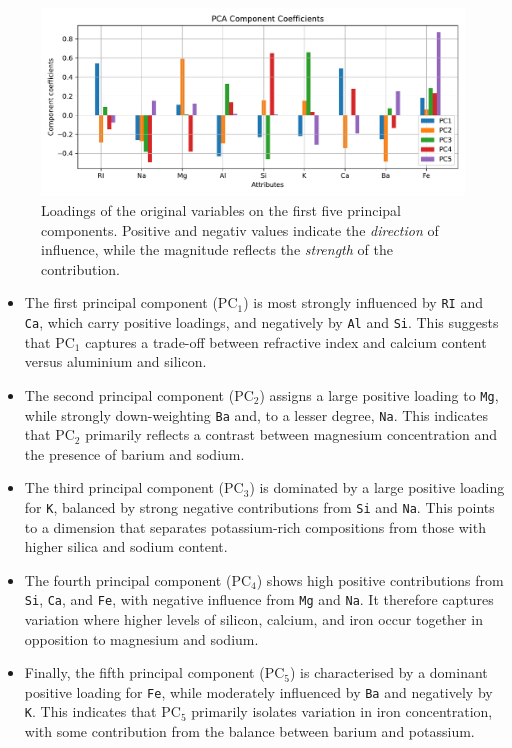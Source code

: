 \documentclass[dtu]{dtuarticle}
\begin{document}
	\begin{figure}
		\centering
		\includegraphics[width=.99\textwidth]{figures/pca_component_coefficients}
		\caption{Loadings of the original variables on the first five principal components. Positive and negativ values indicate the \textit{direction} of influence, while the magnitude reflects the \textit{strength} of the contribution.}
		\label{fig:pc-components}
	\end{figure}

	\begin{itemize}
		\item The first principal component ($\text{PC}_1$) is most strongly influenced by \texttt{RI} and \texttt{Ca}, which carry positive loadings, and negatively by \texttt{Al} and \texttt{Si}. This suggests that $\text{PC}_1$ captures a trade-off between refractive index and calcium content versus aluminium and silicon.

		\item The second principal component ($\text{PC}_2$) assigns a large positive loading to \texttt{Mg}, while strongly down-weighting \texttt{Ba} and, to a lesser degree, \texttt{Na}. This indicates that $\text{PC}_2$ primarily reflects a contrast between magnesium concentration and the presence of barium and sodium.

		\item The third principal component ($\text{PC}_3$) is dominated by a large positive loading for \texttt{K}, balanced by strong negative contributions from \texttt{Si} and \texttt{Na}. This points to a dimension that separates potassium-rich compositions from those with higher silica and sodium content.

		\item The fourth principal component ($\text{PC}_4$) shows high positive contributions from \texttt{Si}, \texttt{Ca}, and \texttt{Fe}, with negative influence from \texttt{Mg} and \texttt{Na}. It therefore captures variation where higher levels of silicon, calcium, and iron occur together in opposition to magnesium and sodium.

		\item Finally, the fifth principal component ($\text{PC}_5$) is characterised by a dominant positive loading for \texttt{Fe}, while moderately influenced by \texttt{Ba} and negatively by \texttt{K}. This indicates that $\text{PC}_5$ primarily isolates variation in iron concentration, with some contribution from the balance between barium and potassium.
	\end{itemize}
\end{document}
